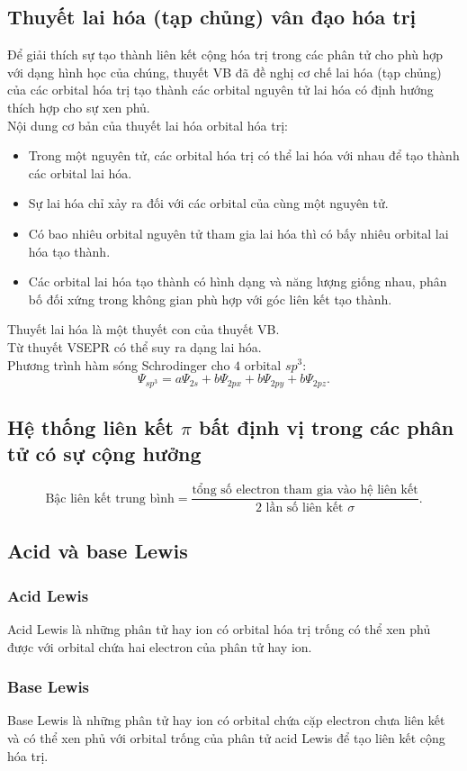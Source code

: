 \subsection{Thuyết lai hóa (tạp chủng) vân đạo hóa trị}
Để giải thích sự tạo thành liên kết cộng hóa trị trong các phân tử cho phù hợp với dạng hình học của chúng, thuyết VB đã đề nghị cơ chế lai hóa (tạp chủng) của các orbital hóa trị tạo thành các orbital nguyên tử lai hóa có định hướng thích hợp cho sự xen phủ.\\
Nội dung cơ bản của thuyết lai hóa orbital hóa trị:
\begin{itemize}
\item Trong một nguyên tử, các orbital hóa trị có thể lai hóa với nhau để tạo thành các orbital lai hóa.
\item Sự lai hóa chỉ xảy ra đối với các orbital của cùng một nguyên tử.
\item Có bao nhiêu orbital nguyên tử tham gia lai hóa thì có bấy nhiêu orbital lai hóa tạo thành.
\item Các orbital lai hóa tạo thành có hình dạng và năng lượng giống nhau, phân bố đối xứng trong không gian phù hợp với góc liên kết tạo thành.
\end{itemize}
Thuyết lai hóa là một thuyết con của thuyết VB.\\
Từ thuyết VSEPR có thể suy ra dạng lai hóa.\\
Phương trình hàm sóng Schrodinger cho $4$ orbital $sp^3:$
$$\Psi_{sp^3} = a \Psi_{2s} + b \Psi_{2px} + b \Psi_{2py} + b \Psi_{2pz}.$$
\subsection{Hệ thống liên kết $\pi$ bất định vị trong các phân tử có sự cộng hưởng}
$$\text{Bậc liên kết trung bình} = \frac{\text{tổng số electron tham gia vào hệ liên kết}}{2 \text{ lần số liên kết } \sigma}.$$
\subsection{Acid và base Lewis}
\subsubsection{Acid Lewis}
Acid Lewis là những phân tử hay ion có orbital hóa trị trống có thể xen phủ được với orbital chứa hai electron của phân tử hay ion.
\subsubsection{Base Lewis}
Base Lewis là những phân tử hay ion có orbital chứa cặp electron chưa liên kết và có thể xen phủ với orbital trống của phân tử acid Lewis để tạo liên kết cộng hóa trị.
